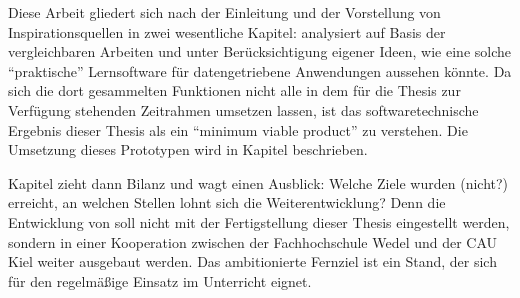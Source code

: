 Diese Arbeit gliedert sich nach der Einleitung und der Vorstellung von Inspirationsquellen in zwei wesentliche Kapitel:  analysiert auf Basis der vergleichbaren Arbeiten und unter Berücksichtigung eigener Ideen, wie eine solche "`praktische"' Lernsoftware für datengetriebene Anwendungen aussehen könnte. Da sich die dort gesammelten Funktionen nicht alle in dem für die Thesis zur Verfügung stehenden Zeitrahmen umsetzen lassen, ist das softwaretechnische Ergebnis dieser Thesis als ein "`minimum viable product"' zu verstehen. Die Umsetzung dieses Prototypen wird in Kapitel  beschrieben.

Kapitel  zieht dann Bilanz und wagt einen Ausblick: Welche Ziele wurden (nicht?) erreicht, an welchen Stellen lohnt sich die Weiterentwicklung? Denn die Entwicklung von \idename{} soll nicht mit der Fertigstellung dieser Thesis eingestellt werden, sondern in einer Kooperation zwischen der Fachhochschule Wedel und der CAU Kiel weiter ausgebaut werden. Das ambitionierte Fernziel ist ein Stand, der sich für den regelmäßige Einsatz im Unterricht eignet.

